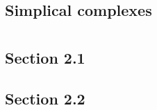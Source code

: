 \documentclass{book}
\begin{document}
\section{Simplical complexes}
\chapter{}

\section{Section 2.1}
\section{Section 2.2}


\printbibliography %
\end{document}
